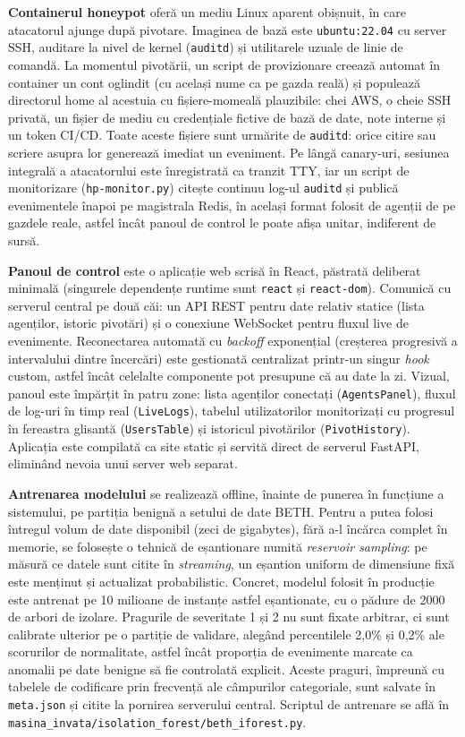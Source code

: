 \textbf{Containerul honeypot} oferă un mediu Linux aparent obișnuit, în
care atacatorul ajunge după pivotare. Imaginea de bază este \texttt{ubuntu:22.04}
cu server SSH, auditare la nivel de kernel (\texttt{auditd}) și utilitarele
uzuale de linie de comandă. La momentul pivotării, un script de
provizionare creează automat în container un cont oglindit (cu același nume
ca pe gazda reală) și populează directorul home al acestuia cu fișiere-momeală
plauzibile: chei AWS, o cheie SSH privată, un fișier de mediu cu credențiale
fictive de bază de date, note interne și un token CI/CD. Toate aceste fișiere
sunt urmărite de \texttt{auditd}: orice citire sau scriere asupra lor generează
imediat un eveniment. Pe lângă canary-uri, sesiunea integrală a atacatorului
este înregistrată ca tranzit TTY, iar un script de monitorizare
(\texttt{hp-monitor.py}) citește continuu log-ul \texttt{auditd} și publică
evenimentele înapoi pe magistrala Redis, în același format folosit de agenții
de pe gazdele reale, astfel încât panoul de control le poate afișa unitar,
indiferent de sursă.

\textbf{Panoul de control} este o aplicație web scrisă în React, păstrată
deliberat minimală (singurele dependențe runtime sunt \texttt{react} și
\texttt{react-dom}). Comunică cu serverul central pe două căi: un API REST
pentru date relativ statice (lista agenților, istoric pivotări) și o conexiune
WebSocket pentru fluxul live de evenimente. Reconectarea automată cu
\textit{backoff} exponențial (creșterea progresivă a intervalului dintre
încercări) este gestionată centralizat printr-un singur \textit{hook}
custom, astfel încât celelalte componente pot presupune că au date la zi.
Vizual, panoul este împărțit în patru zone: lista agenților conectați
(\texttt{AgentsPanel}), fluxul de log-uri în timp real (\texttt{LiveLogs}),
tabelul utilizatorilor monitorizați cu progresul în fereastra glisantă
(\texttt{UsersTable}) și istoricul pivotărilor (\texttt{PivotHistory}).
Aplicația este compilată ca site static și servită direct de serverul
FastAPI, eliminând nevoia unui server web separat.

\textbf{Antrenarea modelului} se realizează offline, înainte de punerea
în funcțiune a sistemului, pe partiția benignă a setului de date BETH.
Pentru a putea folosi întregul volum de date disponibil (zeci de gigabytes),
fără a-l încărca complet în memorie, se folosește o tehnică de eșantionare
numită \textit{reservoir sampling}: pe măsură ce datele sunt citite în
\textit{streaming}, un eșantion uniform de dimensiune fixă este menținut și
actualizat probabilistic. Concret, modelul folosit în producție este antrenat
pe 10 milioane de instanțe astfel eșantionate, cu o pădure de 2000 de arbori
de izolare. Pragurile de severitate 1 și 2 nu sunt fixate arbitrar, ci sunt
calibrate ulterior pe o partiție de validare, alegând percentilele 2,0\% și
0,2\% ale scorurilor de normalitate, astfel încât proporția de evenimente
marcate ca anomalii pe date benigne să fie controlată explicit. Aceste praguri,
împreună cu tabelele de codificare prin frecvență ale câmpurilor categoriale,
sunt salvate în \texttt{meta.json} și citite la pornirea serverului central.
Scriptul de antrenare se află în
\texttt{masina\_invata/isolation\_forest/beth\_iforest.py}.


